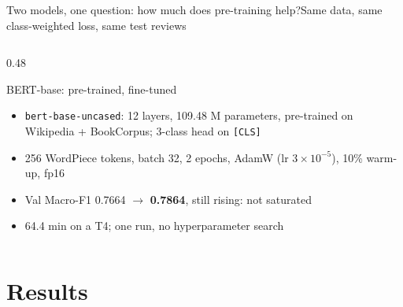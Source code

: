 \documentclass[aspectratio=169,10pt]{beamer}
\begin{document}
\begin{frame}{Two models, one question: how much does pre-training help?}{Same data, same class-weighted loss, same test reviews}
\begin{columns}[T]
\begin{column}{0.48\textwidth}
      \begin{block}{BERT-base: pre-trained, fine-tuned}
        \footnotesize
        \begin{itemize}\setlength{\itemsep}{2pt}
          \item \texttt{bert-base-uncased}: 12 layers, 109.48 M parameters, pre-trained on Wikipedia + BookCorpus; 3-class head on \texttt{[CLS]}
          \item 256 WordPiece tokens, batch 32, 2 epochs, AdamW (lr $3\times10^{-5}$), 10\% warm-up, fp16
          \item Val Macro-F1 0.7664 $\to$ \textbf{0.7864}, still rising: not saturated
          \item 64.4 min on a T4; one run, no hyperparameter search
        \end{itemize}
      \end{block}
    \end{column}
  \end{columns}
\end{frame}

\section{Results}
\end{document}
